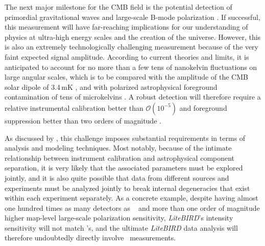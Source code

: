 \documentclass[twocolumn]{aa}
\begin{document}
The next major milestone for the CMB field is the potential detection of primordial gravitational waves and large-scale B-mode polarization \citep[e.g.,][]{kamionkowski:2016}. If successful, this measurement will have far-reaching implications for our understanding of physics at ultra-high energy scales and the creation of the universe. However, this is also an extremely technologically challenging measurement because of the very faint expected signal amplitude. According to current theories and limits, it is anticipated to account for no more than a few tens of nanokelvin fluctuations on large angular scales, which is to be compared with the amplitude of the CMB solar dipole of 3.4\,mK \citep{fixsen2009}, and with polarized astrophysical foreground contamination of tens of microkelvins \citep[e.g.,][]{planck2016-l04}. A robust detection will therefore require a relative instrumental calibration better than $\mathcal{O}(10^{-5})$ and foreground suppression better than two orders of magnitude \citep[e.g.,][]{bp07,bp14}.

As discussed by \citet{bp01}, this challenge imposes substantial requirements in terms of analysis and modeling techniques. Most notably, because of the intimate relationship between instrument calibration and astrophysical component separation, it is very likely that the associated parameters must be explored jointly, and it is also quite possible that data from different sources and experiments must be analyzed jointly to break internal degeneracies that exist within each experiment separately. As a concrete example, despite having almost one hundred times as many detectors as \Planck\ \citep{planck2016-l01} and more than one order of magnitude higher map-level large-scale polarization sensitivity, \textit{LiteBIRD}'s \citep{litebird2022} intensity sensitivity will not match \Planck's, and the ultimate \textit{LiteBIRD} data analysis will therefore undoubtedly directly involve \Planck\ measurements.
\end{document}
